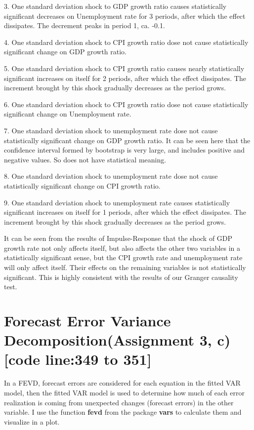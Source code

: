 \documentclass{report}
\begin{document}
3. One standard deviation shock to GDP growth ratio causes statistically significant decreases on Unemployment rate for 3 periods, after which the effect dissipates. The decrement peaks in period 1, ca. -0.1.

4. One standard deviation shock to CPI growth ratio dose not cause statistically significant change on GDP growth ratio.  

5. One standard deviation shock to CPI growth ratio causes nearly statistically significant increases on itself for 2 periods, after which the effect dissipates. The increment brought by this shock gradually decreases as the period grows.

6. One standard deviation shock to CPI growth ratio dose not cause statistically significant change on Unemployment rate.

7. One standard deviation shock to  unemployment rate dose not cause statistically significant change on GDP growth ratio. It can be seen here that the confidence interval formed by bootstrap is very large, and includes positive and negative values. So does not have statistical meaning.

8. One standard deviation shock to  unemployment rate dose not cause statistically significant change on CPI growth ratio.

9. One standard deviation shock to unemployment rate causes statistically significant increases on itself for 1 periods, after which the effect dissipates. The increment brought by this shock gradually decreases as the period grows.

It can be seen from the results of Impulse-Response that the shock of GDP growth rate not only affects itself, but also affects the other two variables in a statistically significant sense, but the CPI growth rate and unemployment rate will only affect itself. Their effects on the remaining variables is not statistically significant. This is highly consistent with the results of our Granger causality test.


\section{Forecast Error Variance Decomposition(Assignment 3, c) [code line:349 to 351]}

In a FEVD, forecast errors are considered for each equation in the fitted VAR model, then the fitted VAR model is used to determine how much of each error realization is coming from unexpected changes (forecast errors) in the other variable. I use the function \textbf{fevd} from the package \textbf{vars} to calculate them and visualize in a plot.
\end{document}
